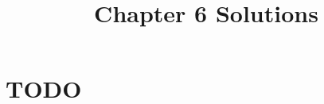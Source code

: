 \documentclass[12pt]{article}
\title{Chapter 6 Solutions}
\begin{document}
\section{TODO}
\end{document}
